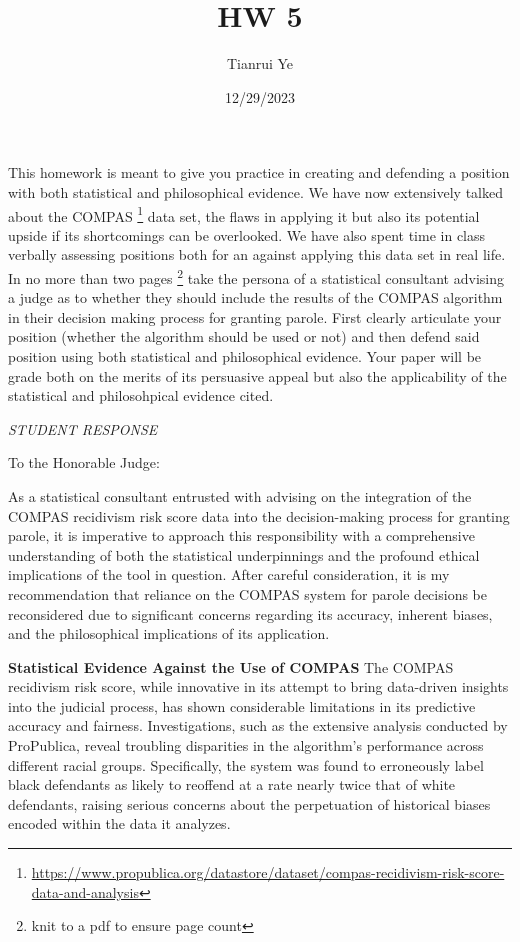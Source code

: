 \documentclass[
]{article}
\title{HW 5}
\author{Tianrui Ye}
\date{12/29/2023}
\begin{document}
\maketitle

This homework is meant to give you practice in creating and defending a
position with both statistical and philosophical evidence. We have now
extensively talked about the COMPAS \footnote{\url{https://www.propublica.org/datastore/dataset/compas-recidivism-risk-score-data-and-analysis}}
data set, the flaws in applying it but also its potential upside if its
shortcomings can be overlooked. We have also spent time in class
verbally assessing positions both for an against applying this data set
in real life. In no more than two pages \footnote{knit to a pdf to
  ensure page count} take the persona of a statistical consultant
advising a judge as to whether they should include the results of the
COMPAS algorithm in their decision making process for granting parole.
First clearly articulate your position (whether the algorithm should be
used or not) and then defend said position using both statistical and
philosophical evidence. Your paper will be grade both on the merits of
its persuasive appeal but also the applicability of the statistical and
philosohpical evidence cited.

\emph{STUDENT RESPONSE}

To the Honorable Judge:

As a statistical consultant entrusted with advising on the integration
of the COMPAS recidivism risk score data into the decision-making
process for granting parole, it is imperative to approach this
responsibility with a comprehensive understanding of both the
statistical underpinnings and the profound ethical implications of the
tool in question. After careful consideration, it is my recommendation
that reliance on the COMPAS system for parole decisions be reconsidered
due to significant concerns regarding its accuracy, inherent biases, and
the philosophical implications of its application.

\textbf{Statistical Evidence Against the Use of COMPAS} The COMPAS
recidivism risk score, while innovative in its attempt to bring
data-driven insights into the judicial process, has shown considerable
limitations in its predictive accuracy and fairness. Investigations,
such as the extensive analysis conducted by ProPublica, reveal troubling
disparities in the algorithm's performance across different racial
groups. Specifically, the system was found to erroneously label black
defendants as likely to reoffend at a rate nearly twice that of white
defendants, raising serious concerns about the perpetuation of
historical biases encoded within the data it analyzes.
\end{document}
